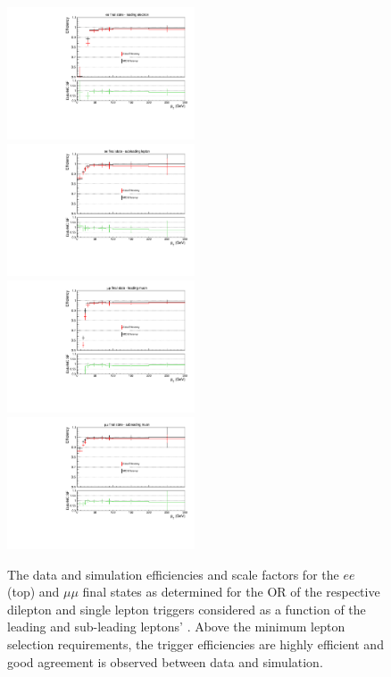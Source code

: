 \begin{figure}[ht]
\centering
\includegraphics[width=0.495\textwidth]{figs/background-estimation/triggerEfficiency/ttbar/electron1_pT_SF_alt.pdf}
\includegraphics[width=0.495\textwidth]{figs/background-estimation/triggerEfficiency/ttbar/electron2_pT_SF_alt.pdf}
\\
\includegraphics[width=0.495\textwidth]{figs/background-estimation/triggerEfficiency/ttbar/muon1_pT_SF_alt.pdf}
\includegraphics[width=0.495\textwidth]{figs/background-estimation/triggerEfficiency/ttbar/muon2_pT_SF_alt.pdf}
\caption{
The data and \ttbar simulation efficiencies and scale factors for the $ee$ (top) and $\mu\mu$ final states as determined for the OR of the respective dilepton and single lepton triggers considered as a function of the leading and sub-leading leptons' \pT. Above the minimum lepton selection \pT requirements, the trigger efficiencies are highly efficient and good agreement is observed between data and simulation.
}
\label{fig:trig_pT_SF}
\end{figure}

